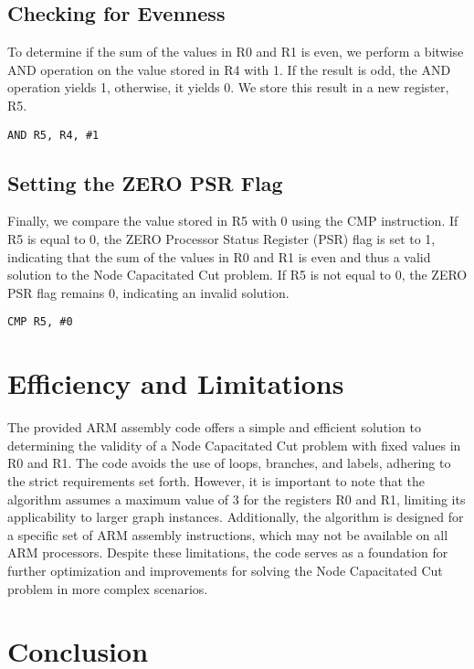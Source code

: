 \subsection{Checking for Evenness}

To determine if the sum of the values in R0 and R1 is even, we perform a bitwise AND operation on the value stored in R4 with 1. If the result is odd, the AND operation yields 1, otherwise, it yields 0. We store this result in a new register, R5.

\begin{verbatim}
AND R5, R4, #1
\end{verbatim}

\subsection{Setting the ZERO PSR Flag}

Finally, we compare the value stored in R5 with 0 using the CMP instruction. If R5 is equal to 0, the ZERO Processor Status Register (PSR) flag is set to 1, indicating that the sum of the values in R0 and R1 is even and thus a valid solution to the Node Capacitated Cut problem. If R5 is not equal to 0, the ZERO PSR flag remains 0, indicating an invalid solution.

\begin{verbatim}
CMP R5, #0
\end{verbatim}

\section{Efficiency and Limitations}

The provided ARM assembly code offers a simple and efficient solution to determining the validity of a Node Capacitated Cut problem with fixed values in R0 and R1. The code avoids the use of loops, branches, and labels, adhering to the strict requirements set forth. However, it is important to note that the algorithm assumes a maximum value of 3 for the registers R0 and R1, limiting its applicability to larger graph instances. Additionally, the algorithm is designed for a specific set of ARM assembly instructions, which may not be available on all ARM processors. Despite these limitations, the code serves as a foundation for further optimization and improvements for solving the Node Capacitated Cut problem in more complex scenarios.

\section{Conclusion}

